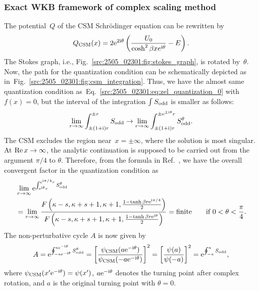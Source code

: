 \subsubsection{Exact WKB framework of complex scaling method}
The potential~$Q$ of the CSM Schr\"odinger equation can be rewritten by
\begin{align}
    Q_{\mathrm{CSM}}(x) = 2\mathrm{e}^{2\mathrm{i} \theta}\left(\frac{U_{0}}{\cosh^2 \beta xe^{\mathrm{i} \theta}} - E\right) .
\end{align}
The Stokes graph, i.e., Fig.~\ref{src:2505_02301:fig:stokes_graph}, is rotated by~$\theta$.
Now, the path for the quantization condition can be schematically depicted as in~Fig.~\ref{src:2505_02301:fig:csm_integration}.
Thus, we have the almost same quantization condition as~Eq.~\eqref{src:2505_02301:eq:zel_quantization_0} with~$f(x)=0$, but the interval of the integration $\int S_{\mathrm{odd}}$ is smaller as follows:
\begin{align}
    \lim_{r\to\infty}\int_{\pm(1+\mathrm{i})r}^{\pm r} S_{\mathrm{odd}}
    \to 
    \lim_{r\to\infty}\int_{\pm(1+\mathrm{i})r}^{\pm \mathrm{e}^{\pm \mathrm{i} \theta}r} S_{\mathrm{odd}}^\theta .
\end{align}
The CSM excludes the region near~$x=\pm\infty$, where the solution is most singular.
At $\operatorname{Re} x\to\infty$, the analytic continuation is supposed to be carried out from the argument $\pi/4$ to $\theta$.
Therefore, from the formula in Ref.~\cite{Morikawa:2025grx}, we have the overall convergent factor in the quantization condition as
\begin{align}
    &\lim_{r\to\infty}\mathrm{e}^{\int_{\mathrm{e}^{\mathrm{i} \theta}r}^{\mathrm{e}^{\mathrm{i} \pi/4}r} S_{\mathrm{odd}}^\theta}\notag\\
    &=\lim_{r\to\infty}
    \frac{F\left( \kappa-s, \kappa+s+1, \kappa+1, \frac{1-\tanh\beta r \mathrm{e}^{\mathrm{i} \pi/4}}{2} \right)}
    {F\left( \kappa-s, \kappa+s+1, \kappa+1, \frac{1-\tanh\beta r \mathrm{e}^{\mathrm{i} \theta}}{2} \right)}
    = \text{finite}
    \qquad \text{if $0<\theta<\frac{\pi}{4}$} .
\end{align}
The non-perturbative cycle $A$ is now given by
\begin{align}
    A = \mathrm{e}^{\oint_{-a \mathrm{e}^{-\mathrm{i} \theta}}^{a \mathrm{e}^{-\mathrm{i} \theta}} S_{\mathrm{odd}}^\theta}
    = \left[\frac{\psi_{\mathrm{CSM}}(a \mathrm{e}^{-\mathrm{i} \theta})}{\psi_{\mathrm{CSM}}(-a \mathrm{e}^{-\mathrm{i} \theta})}\right]^2
    = \left[\frac{\psi(a)}{\psi(-a)}\right]^2
    = \mathrm{e}^{\oint_{-a}^a S_{\mathrm{odd}}} ,
\end{align}
where $\psi_{\mathrm{CSM}}(x' \mathrm{e}^{-\mathrm{i} \theta}) = \psi(x')$, $a \mathrm{e}^{-\mathrm{i} \theta}$ denotes the turning point after complex rotation, and $a$ is the original turning point with $\theta=0$.
